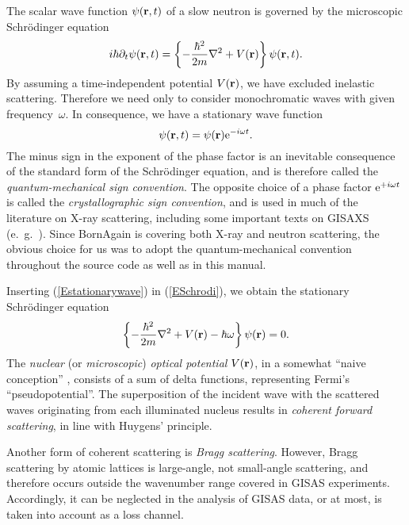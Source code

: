 The scalar wave function $\psi(\mathbf{r},t)$ of a slow neutron
is governed by the microscopic Schrödinger equation
\begin{equation}\label{ESchrodi}
  i\hbar\partial_t \psi(\mathbf{r},t)
  = \left\{-\frac{\hbar^2}{2m}\mathbf{\nabla}^2+V(\mathbf{r})\right\} \psi(\mathbf{r},t).
\end{equation}
By assuming a time-independent potential $V(\mathbf{r})$,
we have excluded inelastic scattering.
Therefore we need only to consider monochromatic waves
with given frequency~$\omega$.
In consequence, we have a stationary wave function
\begin{equation}\label{Estationarywave}
  \psi(\mathbf{r},t) = \psi(\mathbf{r}){\rm e}^{-i\omega t}.
\end{equation}
The minus sign in the exponent of the phase factor
is an inevitable consequence of the standard form of the Schrödinger equation,
and is therefore called the \textit{quantum-mechanical sign convention}.
The opposite choice of a phase factor ${\rm e}^{+i\omega t}$ is 
called the \textit{crystallographic sign convention},
and is used in much of the literature on X-ray scattering,
including some important texts on GISAXS (e.~g.\ \cite{ReLL09}).
Since BornAgain is covering both X-ray and neutron scattering,
the obvious choice for us was to adopt the quantum-mechanical convention
throughout the source code as well as in this manual.

Inserting (\ref{Estationarywave}) in (\ref{ESchrodi}),
we obtain the stationary Schrödinger equation
\begin{equation}\label{EstatSchrodi}
  \left\{-\frac{\hbar^2}{2m}\mathbf{\nabla}^2+V(\mathbf{r})-\hbar\omega\right\} \psi(\mathbf{r}) = 0.
\end{equation}
The \textit{nuclear} (or \textit{microscopic})
\textit{optical potential} $V(\mathbf{r})$,
in a somewhat ``naive conception'' \cite[p.~7]{Sea89},
consists of a sum of delta functions,
representing Fermi's ``pseudopotential''.
The superposition of the incident wave with the scattered waves
originating from each illuminated nucleus
results in \textit{coherent forward scattering},%
in line with Huygens' principle.%

Another form of coherent scattering is \textit{Bragg scattering}.%
However, Bragg scattering by atomic lattices
is large-angle, not small-angle scattering,
and therefore occurs outside the wavenumber range
covered in GISAS experiments.
Accordingly, it can be neglected in the analysis of GISAS data,
or at most, is taken into account as a loss channel.


